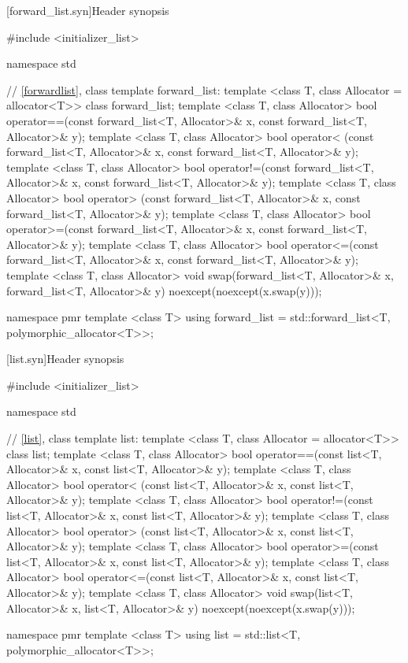 [forward_list.syn]{Header  synopsis}


\begin{codeblock}
#include <initializer_list>

namespace std {
  // \ref{forwardlist}, class template forward_list:
  template <class T, class Allocator = allocator<T>> class forward_list;
  template <class T, class Allocator>
    bool operator==(const forward_list<T, Allocator>& x, const forward_list<T, Allocator>& y);
  template <class T, class Allocator>
    bool operator< (const forward_list<T, Allocator>& x, const forward_list<T, Allocator>& y);
  template <class T, class Allocator>
    bool operator!=(const forward_list<T, Allocator>& x, const forward_list<T, Allocator>& y);
  template <class T, class Allocator>
    bool operator> (const forward_list<T, Allocator>& x, const forward_list<T, Allocator>& y);
  template <class T, class Allocator>
    bool operator>=(const forward_list<T, Allocator>& x, const forward_list<T, Allocator>& y);
  template <class T, class Allocator>
    bool operator<=(const forward_list<T, Allocator>& x, const forward_list<T, Allocator>& y);
  template <class T, class Allocator>
    void swap(forward_list<T, Allocator>& x, forward_list<T, Allocator>& y)
      noexcept(noexcept(x.swap(y)));

  namespace pmr {
    template <class T>
      using forward_list = std::forward_list<T, polymorphic_allocator<T>>;
  }
}
\end{codeblock}

[list.syn]{Header  synopsis}


\begin{codeblock}
#include <initializer_list>

namespace std {
  // \ref{list}, class template list:
  template <class T, class Allocator = allocator<T>> class list;
  template <class T, class Allocator>
    bool operator==(const list<T, Allocator>& x, const list<T, Allocator>& y);
  template <class T, class Allocator>
    bool operator< (const list<T, Allocator>& x, const list<T, Allocator>& y);
  template <class T, class Allocator>
    bool operator!=(const list<T, Allocator>& x, const list<T, Allocator>& y);
  template <class T, class Allocator>
    bool operator> (const list<T, Allocator>& x, const list<T, Allocator>& y);
  template <class T, class Allocator>
    bool operator>=(const list<T, Allocator>& x, const list<T, Allocator>& y);
  template <class T, class Allocator>
    bool operator<=(const list<T, Allocator>& x, const list<T, Allocator>& y);
  template <class T, class Allocator>
    void swap(list<T, Allocator>& x, list<T, Allocator>& y)
      noexcept(noexcept(x.swap(y)));

  namespace pmr {
    template <class T>
      using list = std::list<T, polymorphic_allocator<T>>;
  }
}
\end{codeblock}

